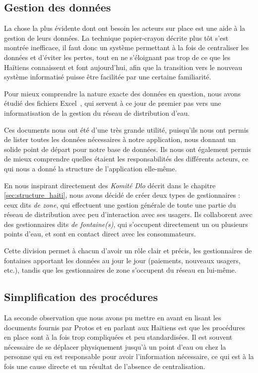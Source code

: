 \documentclass{EPL-master-thesis-covers-FR}
\begin{document}
			\subsection*{Gestion des données}
				\label{sec:gest_donnee}

				La chose la plus évidente dont ont besoin les acteurs sur place est une aide à la gestion de leurs données. La technique papier-crayon décrite plus tôt s'est montrée inefficace, il faut donc un système permettant à la fois de centraliser les données et d'éviter les pertes, tout en ne s'éloignant pas trop de ce que les Haïtiens connaissent et font aujourd'hui, afin que la transition vers le nouveau système informatisé puisse être facilitée par une certaine familiarité.

				Pour mieux comprendre la nature exacte des données en question, nous avons étudié des fichiers Excel~\cite{ref:resumes_documents}, qui servent à ce jour de premier pas vers une informatisation de la gestion du réseau de distribution d'eau.

				Ces documents nous ont été d'une très grande utilité, puisqu'ils nous ont permis de lister toutes les données nécessaires à notre application, nous donnant un solide point de départ pour notre base de données. Ils nous ont également permis de mieux comprendre quelles étaient les responsabilités des différents acteurs, ce qui nous a donné la structure de l'application elle-même.

				En nous inspirant directement des \emph{Komité Dlo} décrit dans le chapitre \ref{sec:structure_haiti}, nous avons décidé de créer deux types de gestionnaires : ceux dits \emph{de zone}, qui effectuent une gestion générale de toute une partie du réseau de distribution avec peu d'interaction avec ses usagers. Ils collaborent avec des gestionnaires dits \emph{de fontaine(s)}, qui s'occupent directement un ou plusieurs points d'eau, et sont en contact direct avec les consommateurs.

				Cette division permet à chacun d'avoir un rôle clair et précis, les gestionnaires de fontaines apportant les données au jour le jour (paiements, nouveaux usagers, etc.), tandis que les gestionnaires de zone s'occupent du réseau en lui-même.

			\subsection*{Simplification des procédures}

				La seconde observation que nous avons pu mettre en avant en lisant les documents fournis par Protos et en parlant aux Haïtiens est que les procédures en place sont à la fois trop compliquées et peu standardisées. Il est souvent nécessaire de se déplacer physiquement jusqu'à un point d'eau ou chez la personne qui en est responsable pour avoir l'information nécessaire, ce qui est à la fois une cause directe et un résultat de l'absence de centralisation.
\end{document}
